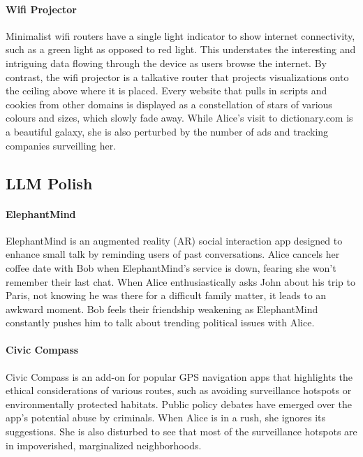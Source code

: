 \paragraph{Wifi Projector}
Minimalist wifi routers have a single light indicator to show internet connectivity, such as a green light as opposed to red light. This understates the interesting and intriguing data flowing through the device as users browse the internet. By contrast, the wifi projector is a talkative router that projects visualizations onto the ceiling above where it is placed. Every website that pulls in scripts and cookies from other domains is displayed as a constellation of stars of various colours and sizes, which slowly fade away. While Alice's visit to dictionary.com is a beautiful galaxy, she is also perturbed by the number of ads and tracking companies surveilling her.

\subsection{LLM Polish}
\paragraph{ElephantMind}
ElephantMind is an augmented reality (AR) social interaction app designed to enhance small talk by reminding users of past conversations. Alice cancels her coffee date with Bob when ElephantMind's service is down, fearing she won't remember their last chat. When Alice enthusiastically asks John about his trip to Paris, not knowing he was there for a difficult family matter, it leads to an awkward moment. Bob feels their friendship weakening as ElephantMind constantly pushes him to talk about trending political issues with Alice.


\paragraph{Civic Compass}
Civic Compass is an add-on for popular GPS navigation apps that highlights the ethical considerations of various routes, such as avoiding surveillance hotspots or environmentally protected habitats. Public policy debates have emerged over the app's potential abuse by criminals. When Alice is in a rush, she ignores its suggestions. She is also disturbed to see that most of the surveillance hotspots are in impoverished, marginalized neighborhoods.

